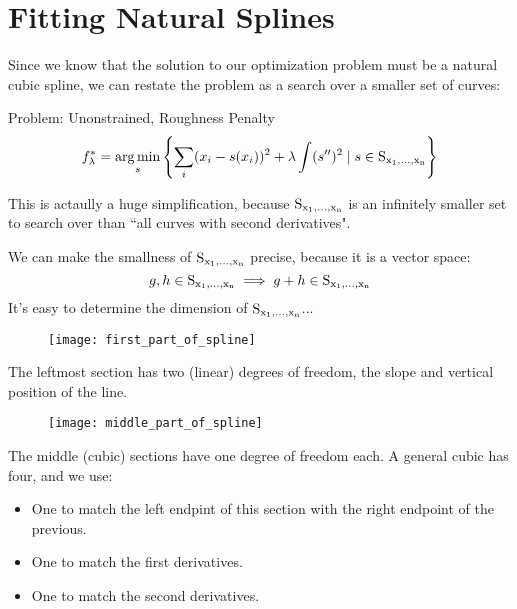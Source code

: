 \section{Fitting Natural Splines}
%
%
\begin{frame}
  Since we know that the solution to our optimization problem must be a natural cubic spline, we can restate the problem as a search over a smaller set of curves:
  \begin{block}{Problem: Unonstrained, Roughness Penalty}
    $$ f_{\lambda}^* = \operatorname*{arg\,min}_{s} \left\{ \sum_i (x_i - s(x_i))^2 + \lambda \int (s'')^2 \mid s \in \operatorname*{S_{x_1, \ldots, x_n}} \right\} $$
  \end{block}
\end{frame}
%
%
\begin{frame}
  This is actaully a huge simplification, because $\operatorname*{S_{x_1, \ldots, x_n}}$ is an infinitely smaller set to search over than ``all curves with second derivatives".
\end{frame}
%
%
\begin{frame}
  We can make the smallness of $\operatorname*{S_{x_1, \ldots, x_n}}$ precise, because it is a vector space:
  $$ g, h \in \operatorname*{S_{x_1, \ldots, x_n}} \implies g + h \in \operatorname*{S_{x_1, \ldots, x_n}} $$
  It's easy to determine the dimension of $\operatorname*{S_{x_1, \ldots, x_n}}$... 
\end{frame}
%
%
\begin{frame}
	\begin{figure}
    \texttt{[image: first\_part\_of\_spline]}
	\end{figure}
  The leftmost section has two (linear) degrees of freedom, the slope and vertical position of the line.
\end{frame}
%
%
\begin{frame}
	\begin{figure}
    \texttt{[image: middle\_part\_of\_spline]}
	\end{figure}
  The middle (cubic) sections have one degree of freedom each.  A general cubic has four, and we use:
  \begin{itemize}
    \item One to match the left endpint of this section with the right endpoint of the previous.
    \item One to match the first derivatives.
    \item One to match the second derivatives.
  \end{itemize}
\end{frame}
%
%
